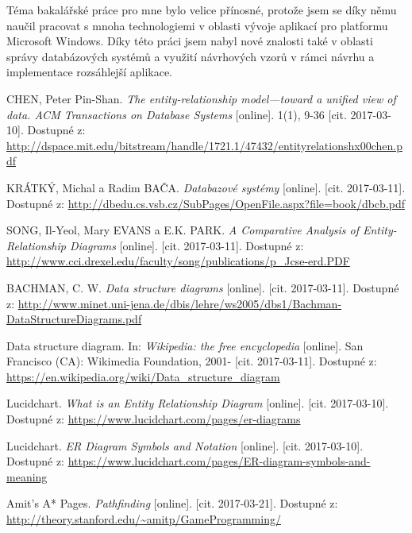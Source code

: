 \documentclass[czech,bachelor,public,dept460,male,oneside]{diploma}
\begin{document}
Téma bakalářské práce pro mne bylo velice přínosné, protože jsem se díky němu naučil pracovat s mnoha technologiemi v oblasti vývoje aplikací pro platformu Microsoft Windows. Díky této práci jsem nabyl nové znalosti také v oblasti správy databázových systémů a využití návrhových vzorů v rámci návrhu a implementace rozsáhlejší aplikace.

\newpage
\begin{thebibliography}{99}
	 CHEN, Peter Pin-Shan. \textit{The entity-relationship model---toward a unified view of data. ACM Transactions on Database Systems} [online]. 1(1), 9-36 [cit. 2017-03-10]. Dostupné z: \url{http://dspace.mit.edu/bitstream/handle/1721.1/47432/entityrelationshx00chen.pdf}
	
	 KRÁTKÝ, Michal a Radim BAČA. \textit{Databazové systémy} [online]. [cit. 2017-03-11]. Dostupné z: \url{http://dbedu.cs.vsb.cz/SubPages/OpenFile.aspx?file=book/dbcb.pdf}
	
	 SONG, Il-Yeol, Mary EVANS a E.K. PARK. \textit{A Comparative Analysis of Entity-Relationship Diagrams} [online]. [cit. 2017-03-11]. Dostupné z: \url{http://www.cci.drexel.edu/faculty/song/publications/p_Jcse-erd.PDF}
	
	 BACHMAN, C. W. \textit{Data structure diagrams} [online]. [cit. 2017-03-11]. Dostupné z: \url{http://www.minet.uni-jena.de/dbis/lehre/ws2005/dbs1/Bachman-DataStructureDiagrams.pdf}
	
	 Data structure diagram. In: \textit{Wikipedia: the free encyclopedia} [online]. San Francisco (CA): Wikimedia Foundation, 2001- [cit. 2017-03-11]. Dostupné z: \url{https://en.wikipedia.org/wiki/Data_structure_diagram}
	
	Lucidchart. \textit{What is an Entity Relationship Diagram} [online]. [cit. 2017-03-10]. Dostupné z: \url{https://www.lucidchart.com/pages/er-diagrams}
	
	Lucidchart. \textit{ER Diagram Symbols and Notation} [online]. [cit. 2017-03-10]. Dostupné z: \url{https://www.lucidchart.com/pages/ER-diagram-symbols-and-meaning}
	
	Amit’s A* Pages. \textit{Pathfinding} [online]. [cit. 2017-03-21]. Dostupné z: \url{http://theory.stanford.edu/~amitp/GameProgramming/}
\end{thebibliography}


\appendix
\end{document}

